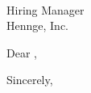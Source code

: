 \documentclass[10pt,letter]{letter}
\def\hm{} %
\begin{document}
\begin{letter}{\hm \\ Hiring Manager \\ Hennge, Inc.  }

\opening{Dear \hm,}

\setlength\parindent{.5in}





\closing{Sincerely,}
\end{letter}
\end{document}
